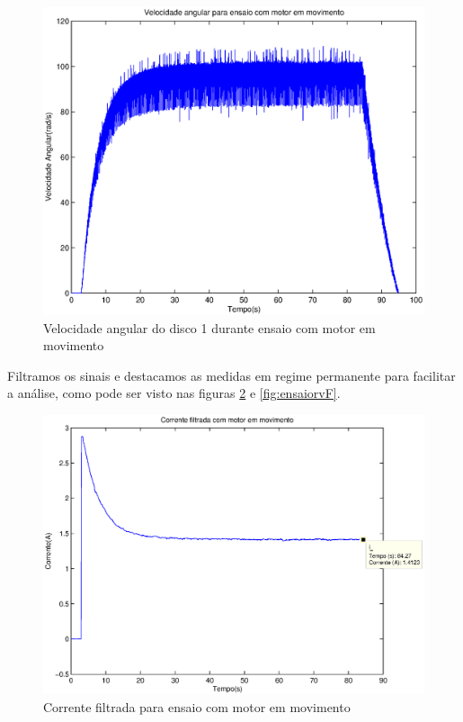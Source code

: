 \documentclass{article}
\begin{document}
\begin{figure}[H]
	\centering
	\includegraphics[width=0.8\linewidth]{../ensaiorv}
	\caption{Velocidade angular do disco 1 durante ensaio com motor em movimento}
	\label{fig:ensaiorv}
\end{figure}

Filtramos os sinais e destacamos as medidas em regime permanente para facilitar a análise, como pode ser visto nas figuras \ref{fig:ensaioriF} e \ref{fig:ensaiorvF}.
\begin{figure}[H]
	\centering
	\includegraphics[width=0.8\linewidth]{../ensaioriF}
	\caption{Corrente filtrada para ensaio com motor em movimento}
	\label{fig:ensaioriF}
\end{figure}
\end{document}

